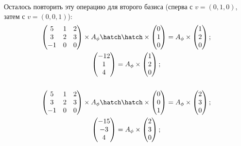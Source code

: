 Осталось повторить эту операцию для второго базиса (сперва с $v = (0, 1, 0)$, затем с $v = (0, 0, 1)$):
\begin{gather*}
    \begin{pmatrix}
        5 & 1 & 2\\
        3 & 2 & 3\\
        -1 & 0 & 0
    \end{pmatrix} \times A_{\phi}\hatch\hatch \times \begin{pmatrix} 0\\ 1\\ 0\end{pmatrix} = A_{\phi} \times \begin{pmatrix} 1\\ 2\\ 0 \end{pmatrix};\\
    \begin{pmatrix} -12\\ 1\\ 4 \end{pmatrix} = A_{\phi} \times \begin{pmatrix} 1\\ 2\\ 0\end{pmatrix};\\ \\
    \begin{pmatrix}
        5 & 1 & 2\\
        3 & 2 & 3\\
        -1 & 0 & 0
    \end{pmatrix} \times A_{\phi}\hatch\hatch \times \begin{pmatrix} 0\\ 0\\ 1\end{pmatrix} = A_{\phi} \times \begin{pmatrix} 2\\ 3\\ 0\end{pmatrix};\\
    \begin{pmatrix} -15\\ -3\\ 4\end{pmatrix} = A_{\phi} \times \begin{pmatrix} 2\\ 3\\ 0\end{pmatrix};
\end{gather*}
